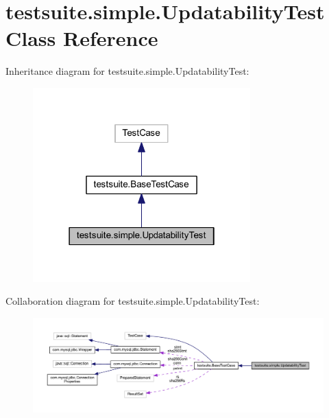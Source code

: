 \hypertarget{classtestsuite_1_1simple_1_1_updatability_test}{}\section{testsuite.\+simple.\+Updatability\+Test Class Reference}
\label{classtestsuite_1_1simple_1_1_updatability_test}


Inheritance diagram for testsuite.\+simple.\+Updatability\+Test\+:
\nopagebreak
\begin{figure}[H]
\begin{center}
\leavevmode
\includegraphics[width=238pt]{classtestsuite_1_1simple_1_1_updatability_test__inherit__graph}
\end{center}
\end{figure}


Collaboration diagram for testsuite.\+simple.\+Updatability\+Test\+:
\nopagebreak
\begin{figure}[H]
\begin{center}
\leavevmode
\includegraphics[width=350pt]{classtestsuite_1_1simple_1_1_updatability_test__coll__graph}
\end{center}
\end{figure}

